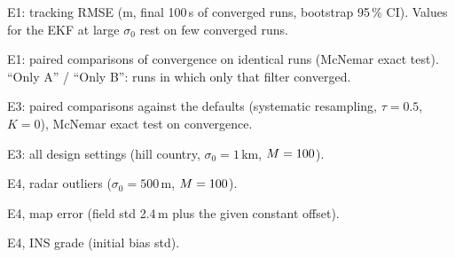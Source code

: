 \begin{table}[H]
  \centering\small
  \caption{E1: tracking RMSE (m, final 100\,s of converged runs, bootstrap 95\,\% CI). Values
    for the EKF at large $\sigma_0$ rest on few converged runs.}\label{tab:e1track}
  
\end{table}

\begin{table}[H]
  \centering\small
  \caption{E1: paired comparisons of convergence on identical runs (McNemar exact test).
    ``Only A'' / ``Only B'': runs in which only that filter converged.}\label{tab:e1tests}
  
\end{table}

\begin{table}[H]
  \centering\small
  \caption{E3: paired comparisons against the defaults (systematic resampling, $\tau = 0.5$,
    $K = 0$), McNemar exact test on convergence.}\label{tab:e3tests}
  
\end{table}

\begin{table}[H]
  \centering\scriptsize
  \caption{E3: all design settings (hill country, $\sigma_0 = 1$\,km, $M = \EThreeRuns$).}\label{tab:e3summary}
  \resizebox{\textwidth}{!}{}
\end{table}

\begin{table}[H]
  \centering\scriptsize
  \caption{E4, radar outliers ($\sigma_0 = 500$\,m, $M = \EFourRuns$).}\label{tab:e4}
  
\end{table}

\begin{table}[H]
  \centering\scriptsize
  \caption{E4, map error (field std 2.4\,m plus the given constant offset).}\label{tab:e4map}
  
\end{table}

\begin{table}[H]
  \centering\scriptsize
  \caption{E4, INS grade (initial bias std).}\label{tab:e4ins}
  
\end{table}

